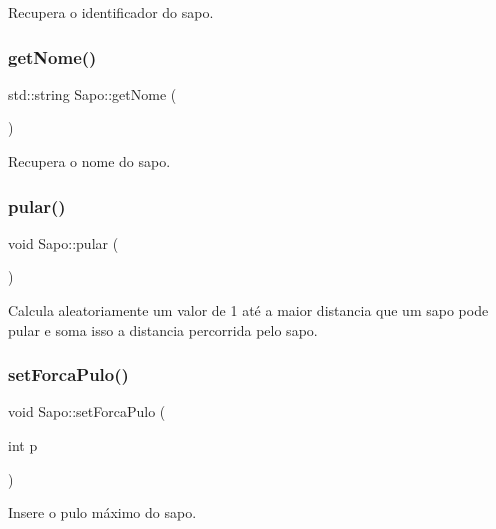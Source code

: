 Recupera o identificador do sapo. 

\mbox{\label{classSapo_a632ae419accb86c10fa2bf8164e648aa}} 
\subsubsection{\texorpdfstring{get\+Nome()}{getNome()}}
{\footnotesize\ttfamily std\+::string Sapo\+::get\+Nome (\begin{DoxyParamCaption}{ }\end{DoxyParamCaption})}



Recupera o nome do sapo. 

\mbox{\label{classSapo_a32e61c61677967120ae652099bd56805}} 
\subsubsection{\texorpdfstring{pular()}{pular()}}
{\footnotesize\ttfamily void Sapo\+::pular (\begin{DoxyParamCaption}{ }\end{DoxyParamCaption})}



Calcula aleatoriamente um valor de 1 até a maior distancia que um sapo pode pular e soma isso a distancia percorrida pelo sapo. 

\mbox{\label{classSapo_ab43f2991360d34d24f73d4cf0e7e9ea6}} 
\subsubsection{\texorpdfstring{set\+Forca\+Pulo()}{setForcaPulo()}}
{\footnotesize\ttfamily void Sapo\+::set\+Forca\+Pulo (\begin{DoxyParamCaption}\item[{int}]{p }\end{DoxyParamCaption})}



Insere o pulo máximo do sapo. 

\mbox{\label{classSapo_a617cde091fd409e66caacee5bf079e05}} 
